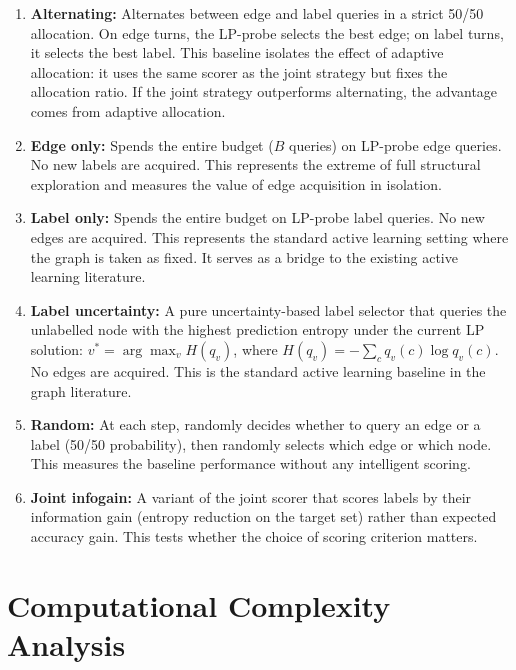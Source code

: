 \documentclass[12pt,a4paper,oneside]{report}
\begin{document}
\begin{enumerate}[leftmargin=2em]
    \item \textbf{Alternating:} Alternates between edge and label queries in a strict 50/50 allocation. On edge turns, the LP-probe selects the best edge; on label turns, it selects the best label. This baseline isolates the effect of adaptive allocation: it uses the same scorer as the joint strategy but fixes the allocation ratio. If the joint strategy outperforms alternating, the advantage comes from adaptive allocation.

    \item \textbf{Edge only:} Spends the entire budget ($B$ queries) on LP-probe edge queries. No new labels are acquired. This represents the extreme of full structural exploration and measures the value of edge acquisition in isolation.

    \item \textbf{Label only:} Spends the entire budget on LP-probe label queries. No new edges are acquired. This represents the standard active learning setting where the graph is taken as fixed. It serves as a bridge to the existing active learning literature.

    \item \textbf{Label uncertainty:} A pure uncertainty-based label selector that queries the unlabelled node with the highest prediction entropy under the current LP solution: $v^* = \arg\max_v H(q_v)$, where $H(q_v) = -\sum_c q_v(c) \log q_v(c)$. No edges are acquired. This is the standard active learning baseline in the graph literature.

    \item \textbf{Random:} At each step, randomly decides whether to query an edge or a label (50/50 probability), then randomly selects which edge or which node. This measures the baseline performance without any intelligent scoring.

    \item \textbf{Joint infogain:} A variant of the joint scorer that scores labels by their information gain (entropy reduction on the target set) rather than expected accuracy gain. This tests whether the choice of scoring criterion matters.
\end{enumerate}

\section{Computational Complexity Analysis}
\end{document}
